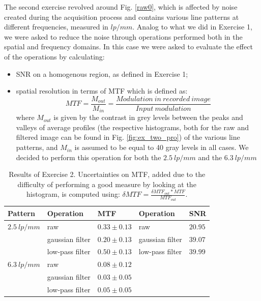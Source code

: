 \documentclass[a4paper]{article}
\begin{document}
The second exercise revolved around Fig. \ref{raw0}, which is affected by noise created during the acquisition process and contains various line patterns at different frequencies, measured in $lp/ mm$. Analog to what we did in Exercise 1, we were asked to reduce the noise through operations performed both in the spatial and frequency domains. In this case we were asked to evaluate the effect of the operations by calculating:
\begin{itemize}
\item SNR on a homogenous region, as defined in Exercise 1;
\item spatial resolution in terms of MTF which is defined as:
\begin{equation}
MTF=\frac{M_{out}}{M_{in}}=\frac{Modulation\ in\ recorded\ image}{Input\ modulation}
\end{equation}
where $M_{out}$ is given by the contrast in grey levels between the peaks and valleys of average profiles (the respective histograms, both for the raw and filtered image can be found in Fig. \ref{fig:ex_two_pro}) of the various line patterns, and $M_{in}$ is assumed to be equal to 40 gray levels in all cases. We decided to perform this operation for both the $2.5\ lp/mm$ and the
$6.3\ lp/mm$
\end{itemize}

\begin{table}[!htb]
	\centering
	\begin{tabular}{| l | l | l || l | l |}
		\hline
		Pattern      & Operation       & MTF           & Operation       & SNR \\ \hline
    $2.5\ lp/mm$ & raw             & $0.33 \pm 0.13$ & raw             & $20.95$ \\ \hline
                 & gaussian filter & $0.20 \pm 0.13$ & gaussian filter & $39.07$ \\ \hline
                 & low-pass filter & $0.50 \pm 0.13$ & low-pass filter & $39.99$ \\ \hline
    $6.3\ lp/mm$ & raw             & $0.08 \pm 0.12$ &                 & \\ \hline
                 & gaussian filter & $0.03 \pm 0.05$ &                 & \\ \hline
                 & low-pass filter & $0.05 \pm 0.05$ &                 & \\ \hline
	\end{tabular}
  \caption{Results of Exercise 2. Uncertainties on MTF, added due to the difficulty of performing a good measure by looking at the histogram, is computed using: $\delta MTF = \frac{\delta MTF_{out}*MTF}{MTF_{out}}$.}
  \label{tab:ex_two}
\end{table}
\end{document}
